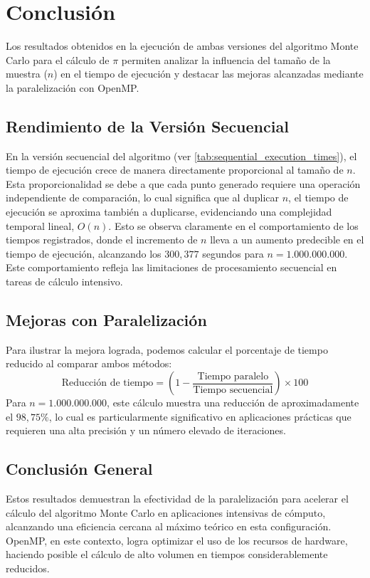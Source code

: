 \documentclass[a4paper, 10pt]{IEEEtran}
\begin{document}
\section{Conclusión}

Los resultados obtenidos en la ejecución de ambas versiones del algoritmo Monte Carlo para el cálculo de $\pi$ permiten analizar la influencia del tamaño de la muestra ($n$) en el tiempo de ejecución y destacar las mejoras alcanzadas mediante la paralelización con OpenMP.

\subsection{Rendimiento de la Versión Secuencial}

En la versión secuencial del algoritmo (ver \cref{tab:sequential_execution_times}), el tiempo de ejecución crece de manera directamente proporcional al tamaño de $n$. Esta proporcionalidad se debe a que cada punto generado requiere una operación independiente de comparación, lo cual significa que al duplicar $n$, el tiempo de ejecución se aproxima también a duplicarse, evidenciando una complejidad temporal lineal, $O(n)$. Esto se observa claramente en el comportamiento de los tiempos registrados, donde el incremento de $n$ lleva a un aumento predecible en el tiempo de ejecución, alcanzando los $300,377$ segundos para $n = 1.000.000.000$. Este comportamiento refleja las limitaciones de procesamiento secuencial en tareas de cálculo intensivo.

\subsection{Mejoras con Paralelización}
Para ilustrar la mejora lograda, podemos calcular el porcentaje de tiempo reducido al comparar ambos métodos:
\[
\text{Reducción de tiempo} = \left(1 - \frac{\text{Tiempo paralelo}}{\text{Tiempo secuencial}}\right) \times 100
\]
Para $n = 1.000.000.000$, este cálculo muestra una reducción de aproximadamente el $98,75\%$, lo cual es particularmente significativo en aplicaciones prácticas que requieren una alta precisión y un número elevado de iteraciones.

\subsection{Conclusión General}

Estos resultados demuestran la efectividad de la paralelización para acelerar el cálculo del algoritmo Monte Carlo en aplicaciones intensivas de cómputo, alcanzando una eficiencia cercana al máximo teórico en esta configuración. OpenMP, en este contexto, logra optimizar el uso de los recursos de hardware, haciendo posible el cálculo de alto volumen en tiempos considerablemente reducidos.
\end{document}
